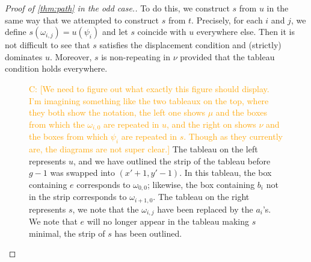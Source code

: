 \documentclass[11pt,reqno]{amsart}
\newcommand{\caelan}[1]{\textcolor{orange}{\sf C: [#1]}}
\theoremstyle{definition}
\theoremstyle{problem}
\theoremstyle{plain}
\theoremstyle{remark}
\theoremstyle{theorem}
\numberwithin{equation}{section}
\numberwithin{figure}{section}
\theoremstyle{definition}
\theoremstyle{problem}
\theoremstyle{plain}
\begin{document}
\begin{proof}[Proof of \cref{thm:path} in the odd case.]
  To do this, we construct $s$ from $u$ in the same way that we
  attempted to construct $s$ from $t$.  Precisely, for each $i$ and
  $j$, we define $s(\omega_{i,j}) = u(\psi_i)$ and let $s$ coincide
  with $u$ everywhere else.  Then it is not difficult to see that $s$
  satisfies the displacement condition and (strictly) dominates $u$.
  Moreover, $s$ is non-repeating in $\nu$ provided that the tableau
  condition holds everywhere.

  \begin{figure}[H]
    
    \caption{\caelan{We need to figure out what exactly this figure
        should display.  I'm imagining something like the two tableaux
        on the top, where they both show the notation, the left one
        shows $\mu$ and the boxes from which the $\omega_{i,0}$ are
        repeated in $u$, and the right on shows $\nu$ and the boxes
        from which $\psi_i$ are repeated in $s$.  Though as they
        currently are, the diagrams are not super clear.} The tableau
      on the left represents $u$, and we have outlined the strip of
      the tableau before $g-1$ was swapped into $(x'+1,y'-1)$. In this
      tableau, the box containing $e$ corresponds to $\omega_{0,0}$;
      likewise, the box containing $b_i$ not in the strip corresponds
      to $\omega_{i+1,0}$. The tableau on the right represents $s$, we
      note that the $\omega_{i,j}$ have been replaced by the
      $a_i$'s. We note that $e$ will no longer appear in the tableau
      making $s$ minimal, the strip of $s$ has been outlined.}
    \label{fig:pathoddproof}
  \end{figure}


\end{proof}
\end{document}
